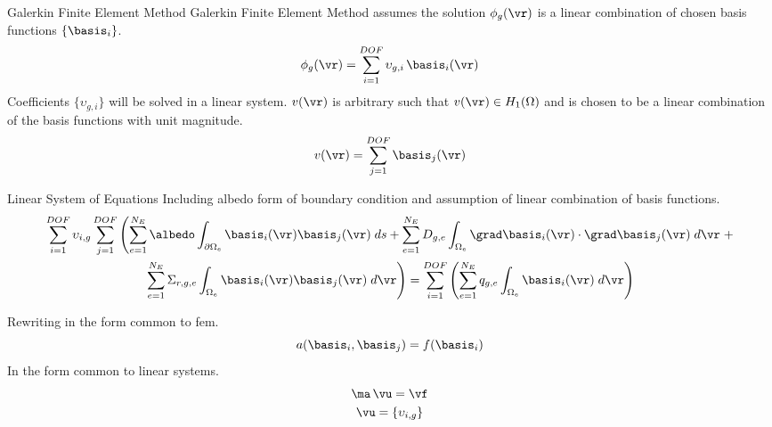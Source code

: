 \begin{frame}{Galerkin Finite Element Method}
  Galerkin Finite Element Method assumes the solution $\phi_g(\vr)$ is a linear
  combination of chosen basis functions $\{\basis_i\}$.
  \begin{equation} 
    \label{eq:linear_combination}
    \phi_g(\vr) = \sum_{i=1}^{DOF} \upsilon_{g,i} \, \basis_i(\vr)
  \end{equation}
  Coefficients $\{\upsilon_{g,i}\}$ will be solved in a linear system.
  $v(\vr)$ is arbitrary such that $v(\vr) \in H_1(\Omega)$ and is chosen to be a
  linear combination of the basis functions with unit magnitude.
  \begin{equation} 
    \label{eq:linear_superposition}
    v(\vr) = \sum_{j=1}^{DOF} \basis_j(\vr)
  \end{equation}
\end{frame}

\begin{frame}{Linear System of Equations}
  Including albedo form of boundary condition and assumption of linear
  combination of basis functions.
  \begin{multline}
    \label{eq:linear_equation}
    \sum_{i=1}^{DOF} \upsilon_{i,g} \sum_{j=1}^{DOF} \left(
      \sum_{e=1}^{N_E} \albedo \int_{\partial \Omega_e}
      \basis_i(\vr)  \basis_j(\vr) \;ds +
      \sum_{e=1}^{N_E} D_{g,e} 
      \int_{\Omega_e} \grad \basis_i(\vr) \cdot \grad \basis_j(\vr)\;d\vr
      \right.
      + \\
      \left.
      \sum_{e=1}^{N_E} \Sigma_{r,g,e}
      \int_{\Omega_e} \basis_i(\vr) \basis_j(\vr) \; d\vr \right) =
      \sum_{i=1}^{DOF} \left(
      \sum_{e=1}^{N_E} q_{g,e} 
      \int_{\Omega_e} \basis_i(\vr) \; d\vr \right)
  \end{multline}

  Rewriting in the form common to \gls{fem}.
  \begin{equation}
    \label{eq:fem_notation}
    a(\basis_i,\basis_j) = f(\basis_i)
  \end{equation}
  In the form common to linear systems.
  \begin{gather}
    \label{eq:matrix_notation}
    \ma \, \vu = \vf \\
    \vu = \{\upsilon_{i,g}\}
  \end{gather}
\end{frame}

